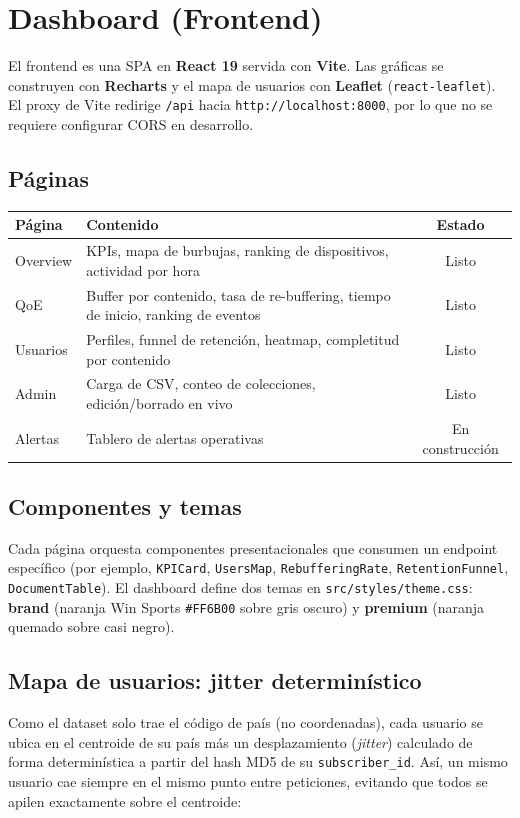 \documentclass[12pt, letterpaper]{article}
\newcommand{\code}[1]{\texttt{#1}}
\begin{document}
\section{Dashboard (Frontend)}
El frontend es una SPA en \textbf{React 19} servida con \textbf{Vite}. Las
gráficas se construyen con \textbf{Recharts} y el mapa de usuarios con
\textbf{Leaflet} (\code{react-leaflet}). El proxy de Vite redirige \code{/api}
hacia \code{http://localhost:8000}, por lo que no se requiere configurar CORS en
desarrollo.

\subsection{Páginas}
\begin{center}
\begin{tabular}{@{}lL{7cm}c@{}}
\toprule
\textbf{Página} & \textbf{Contenido} & \textbf{Estado} \\
\midrule
Overview & KPIs, mapa de burbujas, ranking de dispositivos, actividad por hora & Listo \\
QoE & Buffer por contenido, tasa de re-buffering, tiempo de inicio, ranking de eventos & Listo \\
Usuarios & Perfiles, funnel de retención, heatmap, completitud por contenido & Listo \\
Admin & Carga de CSV, conteo de colecciones, edición/borrado en vivo & Listo \\
Alertas & Tablero de alertas operativas & En construcción \\
\bottomrule
\end{tabular}
\end{center}

\subsection{Componentes y temas}
Cada página orquesta componentes presentacionales que consumen un endpoint
específico (por ejemplo, \code{KPICard}, \code{UsersMap}, \code{RebufferingRate},
\code{RetentionFunnel}, \code{DocumentTable}). El dashboard define dos temas en
\code{src/styles/theme.css}: \textbf{brand} (naranja Win Sports \code{\#FF6B00}
sobre gris oscuro) y \textbf{premium} (naranja quemado sobre casi negro).

\subsection{Mapa de usuarios: jitter determinístico}
Como el dataset solo trae el código de país (no coordenadas), cada usuario se
ubica en el centroide de su país más un desplazamiento (\emph{jitter}) calculado
de forma determinística a partir del hash MD5 de su \code{subscriber\_id}. Así,
un mismo usuario cae siempre en el mismo punto entre peticiones, evitando que
todos se apilen exactamente sobre el centroide:
\end{document}
